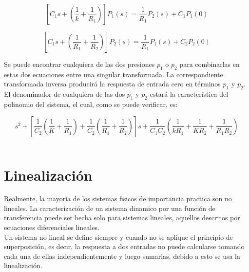 \documentclass[a4paper,12pt,twoside]{proyectotanquesecci}
\begin{document}
\begin{equation}
\left[ C_{1}s+\left( \frac {1}{k}+\frac {1}{R_{1}}\right) \right] P_{1}\left( s\right) =\frac {1}{R_{1}}P_{2}\left( s\right) +C_{1}P_{1}\left( 0\right) 
\end{equation}

\begin{equation}
\left[ C_{1}s+\left( \frac {1}{R_{1}}+\frac {1}{R_{2}}\right) \right] P_{2}\left( s\right) =\frac {1}{R_{1}}P_{1}\left( s\right) +C_{2}P_{2}\left( 0\right) 
\end{equation}

Se puede encontrar cualquiera de las dos presiones $p_{1}$ o $p_{2}$ para combinarlas en estas dos ecuaciones entre una singular transformada. La correspondiente transformada inversa producirá la respuesta de entrada cero en términos $p_{1}$ y $p_{2}$. El denominador de cualquiera de las dos $p_{1}$ y $p_{2}$ estará la característica del polinomio del sistema, el cual, como se puede verificar, es:

\begin{equation}
s^{2}+\left[ \frac {1}{C_{2}}\left( \frac {1}{K}+\frac {1}{R_{1}}\right) +\frac {1}{C_{2}}\left( \frac {1}{R_{1}}+\frac {1}{R_{2}}\right) \right] s+\frac {1}{C_{1}C_{2}}\left( \frac {1}{kR_{1}}+\frac {1}{KR_{2}}+\frac {1}{R_{1}R_{2}}\right) 
\end{equation} \\

\newpage






\section{Linealización}

Realmente, la mayoria de los sistemas fisicos de importancia practica son no lineales. La caracterización de un sistema dinamico por una función de transferencia puede ser hecha solo para sistemas lineales, aquellos descritos por ecuaciones diferenciales lineales. \\

Un sistema no lineal se define siempre y cuando no se aplique el principio de superposición, es decir, la respuesta a dos entradas no puede calcularse tomando cada una de ellas independientemente y luego sumarlas, debido a esto se usa la linealización.\\
\end{document}
